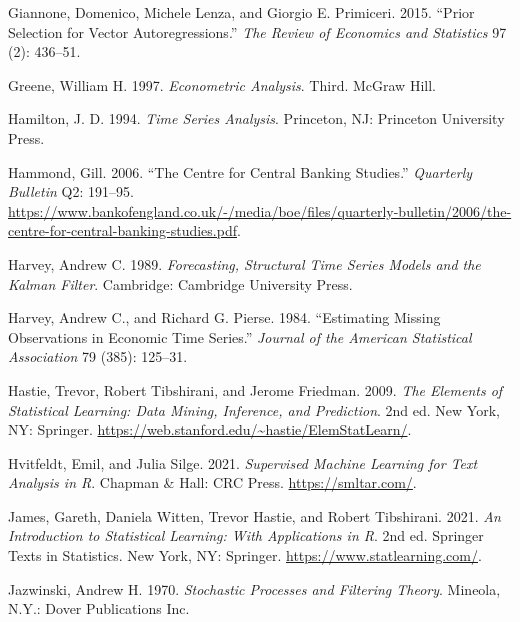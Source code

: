 \documentclass[
  letterpaper,
]{book}
\newlength{\cslhangindent}
\newlength{\cslentryspacingunit} %
\newenvironment{CSLReferences}[2] %
 {%
  \setlength{\parindent}{0pt}
  \ifodd #1
  \let\oldpar\par
  \def\par{\hangindent=\cslhangindent\oldpar}
  \fi
  \setlength{\parskip}{#2\cslentryspacingunit}
 }%
 {}
\begin{document}
\begin{CSLReferences}{1}{0}
\leavevmode{}%
Giannone, Domenico, Michele Lenza, and Giorgio E. Primiceri. 2015.
{``{Prior Selection for Vector Autoregressions}.''} \emph{The Review of
Economics and Statistics} 97 (2): 436--51.

\leavevmode{}%
Greene, William H. 1997. \emph{Econometric Analysis}. Third. McGraw
Hill.

\leavevmode{}%
Hamilton, J. D. 1994. \emph{Time Series Analysis}. Princeton, NJ:
Princeton University Press.

\leavevmode{}%
Hammond, Gill. 2006. {``The Centre for Central Banking Studies.''}
\emph{Quarterly Bulletin} Q2: 191--95.
\url{https://www.bankofengland.co.uk/-/media/boe/files/quarterly-bulletin/2006/the-centre-for-central-banking-studies.pdf}.

\leavevmode{}%
Harvey, Andrew C. 1989. \emph{Forecasting, Structural Time Series Models
and the Kalman Filter}. Cambridge: Cambridge University Press.

\leavevmode{}%
Harvey, Andrew C., and Richard G. Pierse. 1984. {``Estimating Missing
Observations in Economic Time Series.''} \emph{Journal of the American
Statistical Association} 79 (385): 125--31.

\leavevmode{}%
Hastie, Trevor, Robert Tibshirani, and Jerome Friedman. 2009. \emph{The
Elements of Statistical Learning: Data Mining, Inference, and
Prediction}. 2nd ed. New York, NY: Springer.
\url{https://web.stanford.edu/~hastie/ElemStatLearn/}.

\leavevmode{}%
Hvitfeldt, Emil, and Julia Silge. 2021. \emph{Supervised Machine
Learning for Text Analysis in {R}}. Chapman \& Hall: CRC Press.
\url{https://smltar.com/}.

\leavevmode{}%
James, Gareth, Daniela Witten, Trevor Hastie, and Robert Tibshirani.
2021. \emph{An Introduction to Statistical Learning: With Applications
in {R}}. 2nd ed. Springer Texts in Statistics. New York, NY: Springer.
\url{https://www.statlearning.com/}.

\leavevmode{}%
Jazwinski, Andrew H. 1970. \emph{Stochastic Processes and Filtering
Theory}. Mineola, N.Y.: Dover Publications Inc.


\end{CSLReferences}
\end{document}
